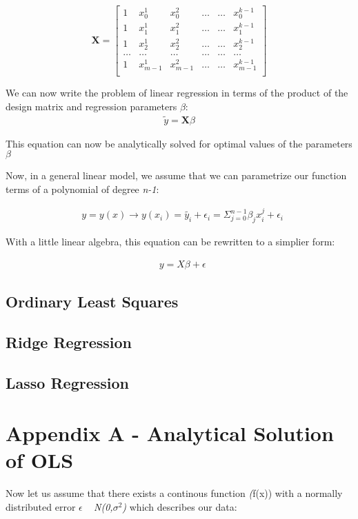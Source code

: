 \documentclass[a4paper, 10pt]{article}
\begin{document}
$$
\boldsymbol{X}=
\begin{bmatrix} 
1& x_{0}^1 &x_{0}^2& \dots & \dots &x_{0}^{k-1}\\
1& x_{1}^1 &x_{1}^2& \dots & \dots &x_{1}^{k-1}\\
1& x_{2}^1 &x_{2}^2& \dots & \dots &x_{2}^{k-1}\\                      
\dots& \dots &\dots& \dots & \dots &\dots\\
1& x_{m-1}^1 &x_{m-1}^2& \dots & \dots &x_{m-1}^{k-1}\\
\end{bmatrix}
$$

We can now write the problem of linear regression in terms of the product of the design matrix and regression parameters $\beta$: 
\begin{gather*}
	\tilde{y} = \textbf{X}\beta
\end{gather*}

This equation can now be analytically solved for optimal values of the parameters $\beta$


Now, in a general linear model, we assume that we can parametrize our function terms of a polynomial of degree \emph{n-1}: 


\begin{gather*}
	\textbf{ $y=y(x) \rightarrow y(x_i) = \tilde{y_i} + \epsilon_i = \Sigma_{j=0}^{n-1} 
						\beta_jx_i^j + \epsilon_i$}
\end{gather*}

With a little linear algebra, this equation can be rewritten to a simplier form: 

\begin{gather*}
	\textbf{ $y=X\beta + \epsilon$}
\end{gather*}


\subsection{Ordinary Least Squares}

\subsection{Ridge Regression}

\subsection{Lasso Regression}



\section{Appendix A - Analytical Solution of OLS}
Now let us assume that there exists a continous function \emph(f(x)) with a normally distributed error $\epsilon$ ~ \emph{N(0,$\sigma^2$)} which describes our data: 
\end{document}
